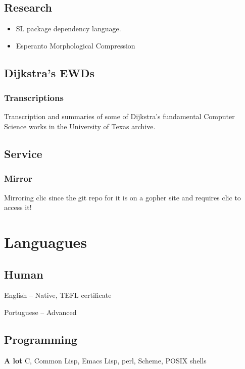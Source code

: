\subsection{Research}
\begin{itemize}[\\]
    \item{SL package dependency language.}
    \item{Esperanto Morphological Compression}
\end{itemize}

\subsection{Dijkstra's EWDs}
\subsubsection{Transcriptions}
Transcription and summaries of some of Dijkstra's fundamental Computer Science works in the University of Texas archive.
\subsection{Service}
\subsubsection{Mirror} Mirroring clic since the git repo for it is on a gopher site and requires clic to access it!

\section{Languagues}
\subsection{Human}
English -- Native, TEFL certificate

Portuguese -- Advanced
\subsection{Programming}
{\bfseries A lot} C, Common Lisp, Emacs Lisp, perl, Scheme, POSIX shells

